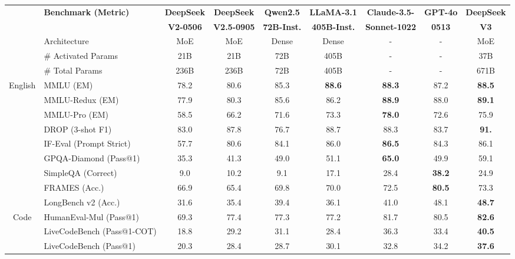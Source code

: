 \begin{table}[h]
    \centering
    \footnotesize
    \setlength{\tabcolsep}{1.9pt}
    \begin{tabular}{@{}c l | c  c | c c c c| c@{}}
    \toprule
    & \multirow{2}{*}{\centering \textbf{Benchmark {\tiny (Metric)}}} & {\textbf{DeepSeek}} & {\textbf{DeepSeek}} & \textbf{Qwen2.5} & \textbf{LLaMA-3.1}  & \textbf{Claude-3.5-}  & \textbf{GPT-4o}& \textbf{DeepSeek} \\
    & & \textbf{V2-0506}& \textbf{V2.5-0905} & \textbf{72B-Inst.} & \textbf{405B-Inst.} & \textbf{Sonnet-1022}  & \textbf{0513} & \textbf{V3} \\
    \midrule
    & Architecture &  MoE & MoE & Dense & Dense &-&- & MoE \\
    & \# Activated Params & 21B & 21B & 72B & 405B& -&-& 37B \\
    & \# Total Params &  236B & 236B & 72B & 405B &-&-& 671B \\
    \midrule
    \multirow{8}{*}{English}&   MMLU {\tiny (EM)}  & 78.2 & 80.6 & 85.3& \textbf{88.6} & \textbf{88.3}&87.2 & \textbf{88.5} \\
     & MMLU-Redux {\tiny (EM)} &77.9 & 80.3 &  85.6 &86.2& \textbf{88.9}& 88.0 & \textbf{89.1}\\
    & MMLU-Pro {\tiny (EM)} & 58.5 &  66.2 & 71.6 &73.3 & \textbf{78.0} & 72.6 & 75.9\\
    & DROP {\tiny (3-shot F1)} &83.0 & 87.8 & 76.7 & 88.7 & 88.3 & 83.7 & \textbf{91.}\\
    & IF-Eval {\tiny (Prompt Strict)} &57.7 & 80.6 & 84.1 & 86.0 & \textbf{86.5} & 84.3 & 86.1\\
    & GPQA-Diamond {\tiny (Pass@1)} & 35.3 & 41.3& 49.0 & 51.1& \textbf{65.0} & 49.9 & 59.1\\
    & SimpleQA {\tiny (Correct)} & 9.0 & 10.2 & 9.1 & 17.1& 28.4 & \textbf{38.2}& 24.9\\
     & FRAMES {\tiny (Acc.)} & 66.9 & 65.4 & 69.8 & 70.0 & 72.5 & \textbf{80.5} & 73.3 \\
     & LongBench v2 {\tiny (Acc.)} & 31.6 & 35.4 & 39.4 & 36.1 & 41.0 & 48.1 &\textbf{48.7} \\
    \midrule
    \multirow{5}{*}{Code} & HumanEval-Mul {\tiny (Pass@1)} & 69.3 &77.4 & 77.3 & 77.2 & {81.7} &80.5&\textbf{82.6}\\
    & LiveCodeBench {\tiny (Pass@1-COT)} &18.8 & 29.2 & 31.1 & 28.4 & 36.3& 33.4& \textbf{40.5} \\
    & LiveCodeBench {\tiny (Pass@1)} &20.3 & 28.4 & 28.7 & 30.1 & 32.8& 34.2& \textbf{37.6} \\

\end{tabular}
\end{table}
